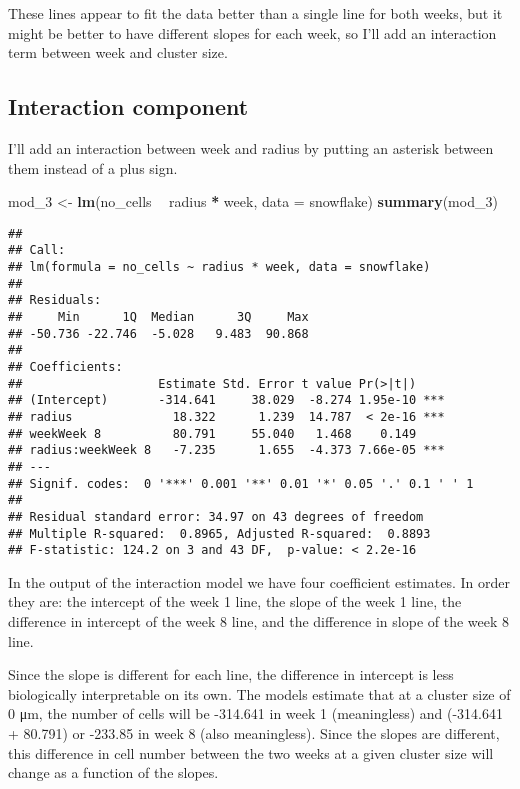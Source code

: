 \documentclass[]{article}
\newenvironment{Shaded}{\begin{snugshade}}{\end{snugshade}}
\newcommand{\KeywordTok}[1]{\textcolor[rgb]{0.13,0.29,0.53}{\textbf{#1}}}
\newcommand{\DataTypeTok}[1]{\textcolor[rgb]{0.13,0.29,0.53}{#1}}
\newcommand{\DecValTok}[1]{\textcolor[rgb]{0.00,0.00,0.81}{#1}}
\newcommand{\StringTok}[1]{\textcolor[rgb]{0.31,0.60,0.02}{#1}}
\newcommand{\OperatorTok}[1]{\textcolor[rgb]{0.81,0.36,0.00}{\textbf{#1}}}
\newcommand{\NormalTok}[1]{#1}
\begin{document}
These lines appear to fit the data better than a single line for both
weeks, but it might be better to have different slopes for each week, so
I'll add an interaction term between week and cluster size.

\subsection{Interaction component}\label{interaction-component}

I'll add an interaction between week and radius by putting an asterisk
between them instead of a plus sign.

\begin{Shaded}
\begin{Highlighting}[]
\NormalTok{mod_}\DecValTok{3}\NormalTok{ <-}\StringTok{ }\KeywordTok{lm}\NormalTok{(no_cells }\OperatorTok{~}\StringTok{ }\NormalTok{radius }\OperatorTok{*}\StringTok{ }\NormalTok{week, }\DataTypeTok{data =}\NormalTok{ snowflake)}
\KeywordTok{summary}\NormalTok{(mod_}\DecValTok{3}\NormalTok{)}
\end{Highlighting}
\end{Shaded}

\begin{verbatim}
## 
## Call:
## lm(formula = no_cells ~ radius * week, data = snowflake)
## 
## Residuals:
##     Min      1Q  Median      3Q     Max 
## -50.736 -22.746  -5.028   9.483  90.868 
## 
## Coefficients:
##                   Estimate Std. Error t value Pr(>|t|)    
## (Intercept)       -314.641     38.029  -8.274 1.95e-10 ***
## radius              18.322      1.239  14.787  < 2e-16 ***
## weekWeek 8          80.791     55.040   1.468    0.149    
## radius:weekWeek 8   -7.235      1.655  -4.373 7.66e-05 ***
## ---
## Signif. codes:  0 '***' 0.001 '**' 0.01 '*' 0.05 '.' 0.1 ' ' 1
## 
## Residual standard error: 34.97 on 43 degrees of freedom
## Multiple R-squared:  0.8965, Adjusted R-squared:  0.8893 
## F-statistic: 124.2 on 3 and 43 DF,  p-value: < 2.2e-16
\end{verbatim}

In the output of the interaction model we have four coefficient
estimates. In order they are: the intercept of the week 1 line, the
slope of the week 1 line, the difference in intercept of the week 8
line, and the difference in slope of the week 8 line.

Since the slope is different for each line, the difference in intercept
is less biologically interpretable on its own. The models estimate that
at a cluster size of 0 μm, the number of cells will be -314.641 in week
1 (meaningless) and (-314.641 + 80.791) or -233.85 in week 8 (also
meaningless). Since the slopes are different, this difference in cell
number between the two weeks at a given cluster size will change as a
function of the slopes.
\end{document}
